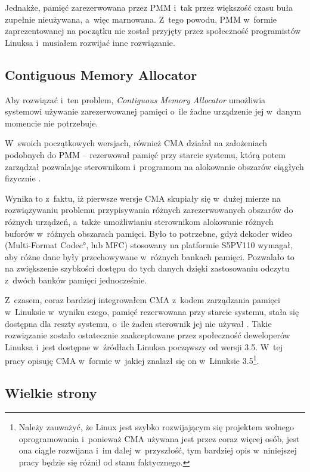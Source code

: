 Jednakże, pamięć zarezerwowana przez PMM i~tak przez większość czasu
buła zupełnie nieużywana, a~więc marnowana.  Z~tego powodu, PMM
w~formie zaprezentowanej na początku nie został przyjęty przez
społeczność programistów Linuksa i~musiałem rozwijać inne rozwiązanie.

\subsection{Contiguous Memory Allocator}

Aby rozwiązać i~ten problem, {\it Contiguous Memory Allocator}
umożliwia systemowi używanie zarezerwowanej pamięci o~ile żadne
urządzenie jej w~danym momencie nie potrzebuje.

W~swoich początkowych wersjach, również CMA działał na założeniach
podobnych do PMM -- rezerwował pamięć przy starcie systemu, którą
potem zarządzał pozwalając sterownikom i~programom na alokowanie
obszarów ciągłych fizycznie \cite{patch:cma-4}.

Wynika to z~faktu, iż pierwsze wersje CMA skupiały się w~dużej mierze
na rozwiązywaniu problemu przypisywania różnych zarezerwowanych
obszarów do różnych urządzeń, a~także umożliwianiu sterownikom
alokowanie różnych buforów w~różnych obszarach pamięci.  Było to
potrzebne, gdyż dekoder wideo (\ang{Multi-Format Codec}, lub MFC)
stosowany na platformie S5PV110 wymagał, aby różne dane były
przechowywane w~różnych bankach pamięci.  Pozwalało to na zwiększenie
szybkości dostępu do tych danych dzięki zastosowaniu odczytu z~dwóch
banków pamięci jednocześnie.

Z~czasem, coraz bardziej integrowałem CMA z~kodem zarządzania pamięci
w~Linuksie w~wyniku czego, pamięć rezerwowana przy starcie systemu,
stała się dostępna dla reszty systemu, o~ile żaden sterownik jej nie
używał \cite{patch:cma-24}.  Takie rozwiązanie zostało ostatecznie
zaakceptowane przez społeczność deweloperów Linuksa i~jest dostępne
w~źródłach Linuksa począwszy od wersji 3.5.  W~tej pracy opisuję CMA
w~formie w~jakiej znalazł się on w~Linuksie 3.5\footnote{Należy
  zauważyć, że Linux jest szybko rozwijającym się projektem wolnego
  oprogramowania i~ponieważ CMA używana jest przez coraz więcej osób,
  jest ona ciągle rozwijana i~im dalej w~przyszłość, tym bardziej opis
  w~niniejszej pracy będzie się różnił od stanu faktycznego.}.

\subsection{Wielkie strony}

